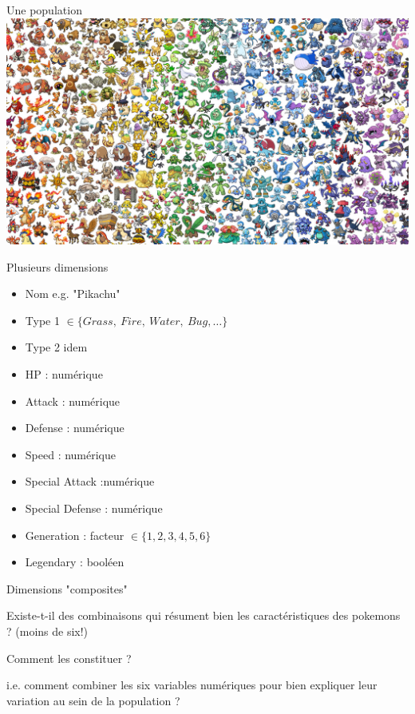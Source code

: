 \documentclass{beamer}
\begin{document}
\begin{frame}{Une population}
\centering
\includegraphics[width=\textwidth,keepaspectratio]{img/pokemons.jpeg}
\end{frame}

\begin{frame}{Plusieurs dimensions}
\centering
\begin{itemize}
	\item Nom e.g. "Pikachu"
	\item Type 1 $\in\{Grass,\ Fire,\ Water,\ Bug, \dots \}$
	\item Type 2 idem
	\item HP : numérique 
	\item Attack : numérique 
	\item Defense : numérique 
	\item Speed : numérique 
	\item Special Attack :numérique 
	\item Special Defense  : numérique
	\item Generation : facteur $\in \{1,2,3,4,5,6\}$
	\item Legendary : booléen
\end{itemize}

\end{frame}


\begin{frame}{Dimensions "composites"}


Existe-t-il des combinaisons qui \alert{résument bien} les caractéristiques des pokemons ? (moins de six!)

\medskip \medskip

Comment les constituer ? 

\medskip \medskip

i.e. comment \alert{combiner} les six variables numériques pour bien \alert{expliquer leur variation} au sein de la population ? 



\end{frame}
\end{document}
